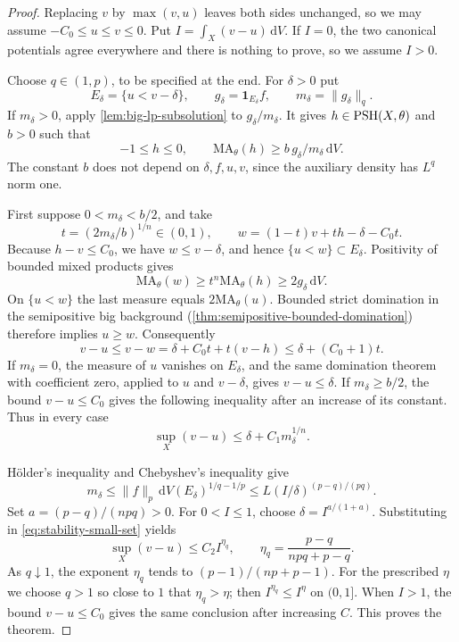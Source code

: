 \begin{proof}
Replacing $v$ by $\max(v,u)$ leaves both sides unchanged, so we may assume
$-C_0\leq u\leq v\leq0$. Put $I=\int_X(v-u)\,\mathrm{d}V$. If $I=0$, the two canonical potentials agree everywhere and there is nothing to prove, so we assume $I>0$.

Choose $q\in(1,p)$, to be specified at the end. For $\delta>0$ put
\[
 E_\delta=\{u<v-\delta\},\qquad
 g_\delta=\mathbf1_{E_\delta}f,\qquad
 m_\delta=\|g_\delta\|_q.
\]
If $m_\delta>0$, apply \cref{lem:big-lp-subsolution} to $g_\delta/m_\delta$. It gives $h\in\mathrm{PSH}(X,\theta)$ and $b>0$ such that
\[
 -1\leq h\leq0,\qquad
 \mathrm{MA}_\theta(h)\geq b\,g_\delta/m_\delta\,\mathrm{d}V.
\]
The constant $b$ does not depend on $\delta,f,u,v$, since the auxiliary density has $L^q$ norm one.

First suppose $0<m_\delta<b/2$, and take
\[
 t=(2m_\delta/b)^{1/n}\in(0,1),\qquad
 w=(1-t)v+th-\delta-C_0t.
\]
Because $h-v\leq C_0$, we have $w\leq v-\delta$, and hence
$\{u<w\}\subset E_\delta$. Positivity of bounded mixed products gives
\[
 \mathrm{MA}_\theta(w)\geq t^n\mathrm{MA}_\theta(h)
       \geq2g_\delta\,\mathrm{d}V.
\]
On $\{u<w\}$ the last measure equals $2\mathrm{MA}_\theta(u)$. Bounded strict domination in the semipositive big background (\cref{thm:semipositive-bounded-domination}) therefore implies $u\geq w$. Consequently
\[
 v-u\leq v-w
      =\delta+C_0t+t(v-h)\leq\delta+(C_0+1)t.
\]
If $m_\delta=0$, the measure of $u$ vanishes on $E_\delta$, and the same domination theorem with coefficient zero, applied to $u$ and $v-\delta$, gives $v-u\leq\delta$. If $m_\delta\geq b/2$, the bound $v-u\leq C_0$ gives the following inequality after an increase of its constant. Thus in every case
\begin{equation}\label{eq:stability-small-set}
 \sup_X(v-u)\leq\delta+C_1m_\delta^{1/n}.
\end{equation}

H\"older's inequality and Chebyshev's inequality give
\[
 m_\delta\leq\|f\|_p\,\mathrm{d}V(E_\delta)^{1/q-1/p}
       \leq L(I/\delta)^{(p-q)/(pq)}.
\]
Set $a=(p-q)/(npq)>0$. For $0<I\leq1$, choose
$\delta=I^{a/(1+a)}$. Substituting in \eqref{eq:stability-small-set} yields
\[
 \sup_X(v-u)\leq C_2 I^{\eta_q},
 \qquad \eta_q=\frac{p-q}{npq+p-q}.
\]
As $q\downarrow1$, the exponent $\eta_q$ tends to $(p-1)/(np+p-1)$. For the prescribed $\eta$ we choose $q>1$ so close to $1$ that $\eta_q>\eta$; then $I^{\eta_q}\leq I^\eta$ on $(0,1]$. When $I>1$, the bound $v-u\leq C_0$ gives the same conclusion after increasing $C$. This proves the theorem.
\end{proof}

